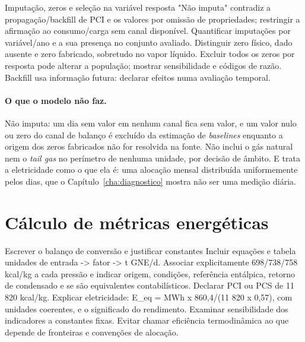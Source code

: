 {Imputação, zeros e seleção na variável resposta}
{"Não imputa" contradiz a propagação/backfill de PCI e os valores por
omissão de propriedades; restringir a afirmação ao consumo/carga sem
canal disponível. Quantificar imputações por variável/ano e a sua presença
no conjunto avaliado. Distinguir zero físico, dado ausente e zero fabricado,
sobretudo no vapor líquido. Excluir todos os zeros por resposta pode
alterar a população; mostrar sensibilidade e códigos de razão.
Backfill usa informação futura: declarar efeitos numa avaliação temporal.}%
\paragraph{O que o modelo não faz.} Não imputa: um dia sem valor em nenhum
canal fica sem valor, e um valor nulo ou zero do canal de balanço é
excluído da estimação de \emph{baselines} enquanto a origem dos zeros
fabricados não for resolvida na fonte. Não inclui o gás natural nem o
\emph{tail gas} no perímetro de nenhuma unidade, por decisão de âmbito.
E trata a eletricidade como o que ela é: uma alocação mensal distribuída
uniformemente pelos dias, que o Capítulo~\ref{cha:diagnostico} mostra não
ser uma medição diária.

\section{Cálculo de métricas energéticas}
\label{sec:metricas}

{Escrever o balanço de conversão e justificar constantes}
{Incluir equações e tabela unidades de entrada -\textgreater{} fator -\textgreater{} t GNE/d.
Associar explicitamente 698/738/758 kcal/kg a cada pressão e indicar
origem, condições, referência entálpica, retorno de condensado e se são
equivalentes contabilísticos. Declarar PCI ou PCS de 11 820 kcal/kg.
Explicar eletricidade: E\_eq = MWh x 860,4/(11 820 x 0,57), com unidades
coerentes, e o significado do rendimento. Examinar sensibilidade dos
indicadores a constantes fixas. Evitar chamar eficiência termodinâmica
ao que depende de fronteiras e convenções de alocação.}%
